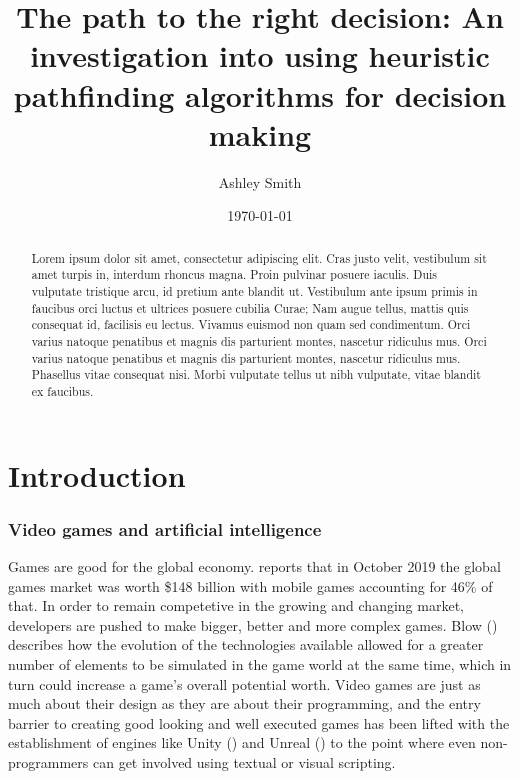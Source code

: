 \documentclass[11pt, a4paper]{article}
\begin{document}
\title{\titlefont The path to the right decision: An investigation into using heuristic pathfinding algorithms for decision making}
\author{Ashley Smith}
\date{\today}
\maketitle
\thispagestyle{empty}

\renewcommand\abstractname{\textbf{Abstract}}
\begin{abstract}
Lorem ipsum dolor sit amet, consectetur adipiscing elit. Cras justo velit, vestibulum sit amet turpis in, interdum rhoncus magna. Proin pulvinar posuere iaculis. Duis vulputate tristique arcu, id pretium ante blandit ut. Vestibulum ante ipsum primis in faucibus orci luctus et ultrices posuere cubilia Curae; Nam augue tellus, mattis quis consequat id, facilisis eu lectus. Vivamus euismod non quam sed condimentum. Orci varius natoque penatibus et magnis dis parturient montes, nascetur ridiculus mus. Orci varius natoque penatibus et magnis dis parturient montes, nascetur ridiculus mus. Phasellus vitae consequat nisi. Morbi vulputate tellus ut nibh vulputate, vitae blandit ex faucibus.
\end{abstract}

\cleardoublepage
\setcounter{page}{1}
\tableofcontents

\cleardoublepage
{}
\setcounter{page}{1}
\section{Introduction}

\subsubsection{Video games and artificial intelligence}

Games are good for the global economy. \citeauthor{Newzoo} reports that in October 2019 the global games market was worth \$148 billion with mobile games accounting for 46\% of that. In order to remain competetive in the growing and changing market, developers are pushed to make bigger, better and more complex games. Blow (\citeyear{blow2004game}) describes how the evolution of the technologies available allowed for a greater number of elements to be simulated in the game world at the same time, which in turn could increase a game's overall potential worth. Video games are just as much about their design as they are about their programming, and the entry barrier to creating good looking and well executed games has been lifted with the establishment of engines like Unity (\cite{Unity}) and Unreal (\cite{Unreal}) to the point where even non-programmers can get involved using textual or visual scripting.
\end{document}
